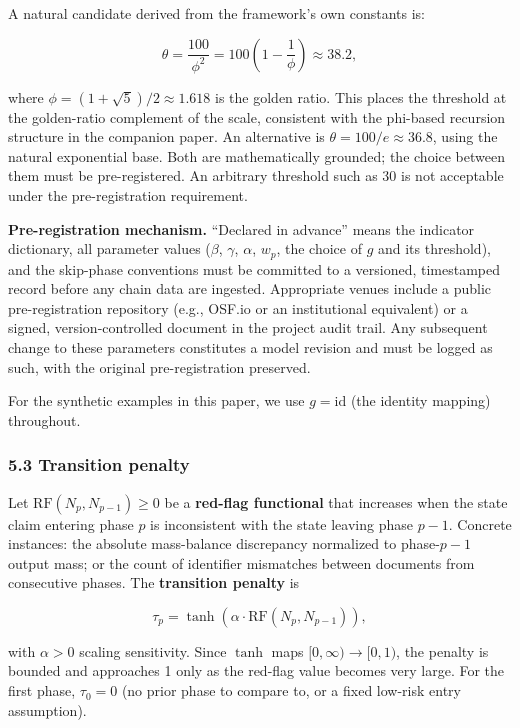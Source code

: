 \documentclass[
  11pt,
  letterpaper,
]{article}
\begin{document}
A natural candidate derived from the framework's own constants is:

\[\theta = \frac{100}{\phi^2} = 100\left(1 - \frac{1}{\phi}\right) \approx 38.2,\]

where \(\phi = (1+\sqrt{5})/2 \approx 1.618\) is the golden ratio. This
places the threshold at the golden-ratio complement of the scale,
consistent with the phi-based recursion structure in the companion
paper. An alternative is \(\theta = 100/e \approx 36.8\), using the
natural exponential base. Both are mathematically grounded; the choice
between them must be pre-registered. An arbitrary threshold such as 30
is not acceptable under the pre-registration requirement.

\textbf{Pre-registration mechanism.} ``Declared in advance'' means the
indicator dictionary, all parameter values (\(\beta\), \(\gamma\),
\(\alpha\), \(w_p\), the choice of \(g\) and its threshold), and the
skip-phase conventions must be committed to a versioned, timestamped
record before any chain data are ingested. Appropriate venues include a
public pre-registration repository (e.g., OSF.io or an institutional
equivalent) or a signed, version-controlled document in the project
audit trail. Any subsequent change to these parameters constitutes a
model revision and must be logged as such, with the original
pre-registration preserved.

For the synthetic examples in this paper, we use \(g = \mathrm{id}\)
(the identity mapping) throughout.

\subsubsection{5.3 Transition penalty}\label{transition-penalty}

Let \(\mathrm{RF}(N_p, N_{p-1}) \geq 0\) be a \textbf{red-flag
functional} that increases when the state claim entering phase \(p\) is
inconsistent with the state leaving phase \(p-1\). Concrete instances:
the absolute mass-balance discrepancy normalized to phase-\(p-1\) output
mass; or the count of identifier mismatches between documents from
consecutive phases. The \textbf{transition penalty} is

\[\tau_p = \tanh\!\left(\alpha \cdot \mathrm{RF}(N_p, N_{p-1})\right),\]

with \(\alpha > 0\) scaling sensitivity. Since \(\tanh\) maps
\([0,\infty) \rightarrow [0,1)\), the penalty is bounded and approaches
1 only as the red-flag value becomes very large. For the first phase,
\(\tau_0 = 0\) (no prior phase to compare to, or a fixed low-risk entry
assumption).
\end{document}
